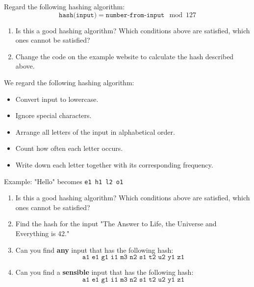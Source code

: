 \documentclass[11pt,a4paper]{report}
\begin{document}
\begin{ex}
Regard the following hashing algorithm: 
\[
\texttt{hash(input)} = \texttt{number-from-input} \mod 127
\]
\begin{enumerate}
\item Is this a good hashing algorithm? Which conditions above are satisfied, which ones cannot be satisfied?
\item Change the code on the example website to calculate the hash described above. 
\end{enumerate}
\end{ex}

\begin{ex}
We regard the following hashing algorithm: 
\begin{itemize}
\item Convert input to lowercase.
\item Ignore special characters.
\item Arrange all letters of the input in alphabetical order.
\item Count how often each letter occurs.
\item Write down  each letter together with its corresponding frequency.
\end{itemize}
Example: "Hello" becomes \texttt{e1 h1 l2 o1}
\begin{enumerate}
\item Is this a good hashing algorithm? Which conditions above are satisfied, which ones cannot be satisfied?
\item Find the hash for the input "The Answer to Life, the Universe and Everything is 42."
\item Can you find {\bf any} input that has the following hash:
\[
\texttt{a1 e1 g1 i1 m3 n2 s1 t2 u2 y1 z1}
\]
\item Can you find a {\bf sensible} input that has the following hash:
\[
\texttt{a1 e1 g1 i1 m3 n2 s1 t2 u2 y1 z1}
\]
\end{enumerate}
\end{ex}
\end{document}
